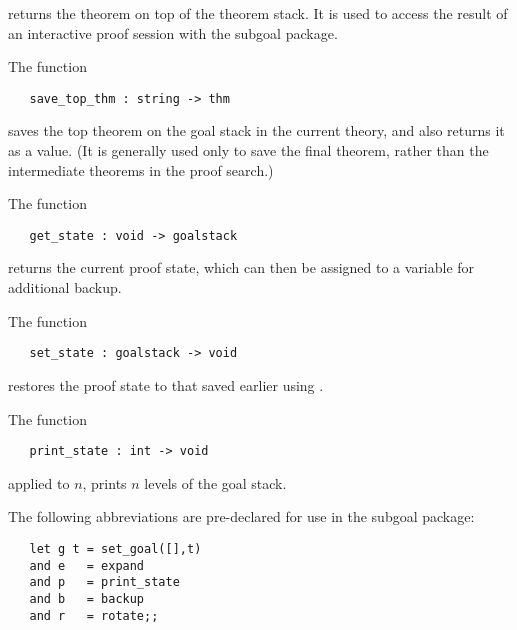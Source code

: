 \noindent returns the theorem on top of the theorem stack. It is used
to access the result of an interactive proof session
with the subgoal package.

The function

\begin{boxed}\begin{verbatim}
   save_top_thm : string -> thm
\end{verbatim}\end{boxed}


\noindent saves the top theorem on the goal stack in
the current theory, and also returns it as a value.
(It is
generally used only to save the final theorem, 
rather than the intermediate theorems in the
proof search.)

The function

\begin{boxed}\begin{verbatim}
   get_state : void -> goalstack
\end{verbatim}\end{boxed}

\noindent returns the current proof state, which can then be 
assigned to a variable
for additional backup.

The function

\begin{boxed}\begin{verbatim}
   set_state : goalstack -> void
\end{verbatim}\end{boxed}

\noindent restores the proof state to that saved earlier using .

The function

\begin{boxed}\begin{verbatim}
   print_state : int -> void
\end{verbatim}\end{boxed}
applied to $n$, prints $n$ levels of the goal stack.

The following abbreviations are pre-declared for use in the subgoal package:

\begin{hol}\begin{verbatim}
   let g t = set_goal([],t)
   and e   = expand
   and p   = print_state
   and b   = backup
   and r   = rotate;;
\end{verbatim}\end{hol}

